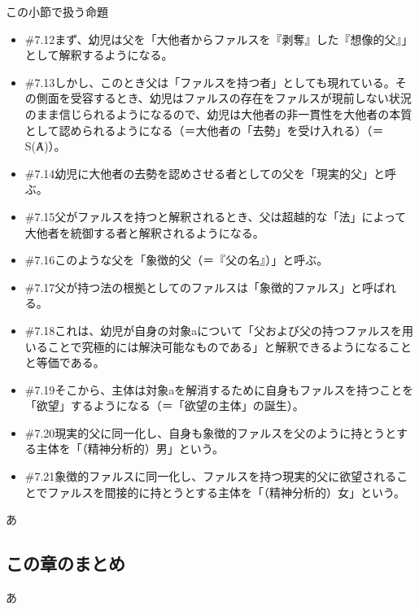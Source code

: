 \begin{note}{この小節で扱う命題}
\begin{itemize}
    \item{\#7.12}まず、幼児は父を「大他者からファルスを『剥奪』した『想像的父』」として解釈するようになる。
    \item{\#7.13}しかし、このとき父は「ファルスを持つ者」としても現れている。その側面を受容するとき、幼児はファルスの存在をファルスが現前しない状況のまま信じられるようになるので、幼児は大他者の非一貫性を大他者の本質として認められるようになる（＝大他者の「去勢」を受け入れる）（＝S(Ⱥ)）。
    \item{\#7.14}幼児に大他者の去勢を認めさせる者としての父を「現実的父」と呼ぶ。
    \item{\#7.15}父がファルスを持つと解釈されるとき、父は超越的な「法」によって大他者を統御する者と解釈されるようになる。
    \item{\#7.16}このような父を「象徴的父（＝『父の名』）」と呼ぶ。
    \item{\#7.17}父が持つ法の根拠としてのファルスは「象徴的ファルス」と呼ばれる。
    \item{\#7.18}これは、幼児が自身の対象aについて「父および父の持つファルスを用いることで究極的には解決可能なものである」と解釈できるようになることと等価である。
    \item{\#7.19}そこから、主体は対象aを解消するために自身もファルスを持つことを「欲望」するようになる（＝「欲望の主体」の誕生）。
    \item{\#7.20}現実的父に同一化し、自身も象徴的ファルスを父のように持とうとする主体を「（精神分析的）男」という。
    \item{\#7.21}象徴的ファルスに同一化し、ファルスを持つ現実的父に欲望されることでファルスを間接的に持とうとする主体を「（精神分析的）女」という。
  \end{itemize}
\end{note}

あ

\subsection{この章のまとめ}\label{ux3053ux306eux7ae0ux306eux307eux3068ux3081}

あ
